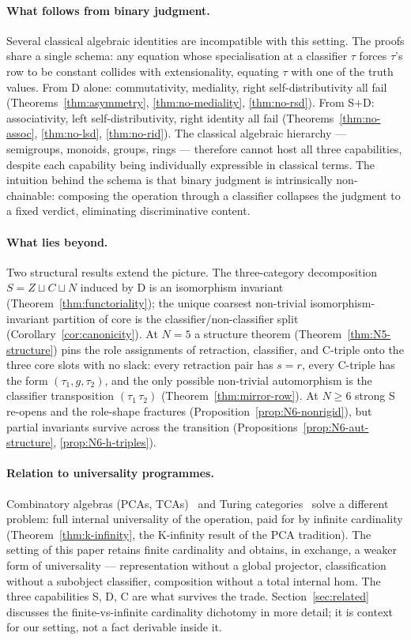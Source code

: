 \documentclass[sigconf,screen]{acmart}
\theoremstyle{remark}
\begin{document}
\paragraph{What follows from binary judgment.} Several classical
algebraic identities are incompatible with this setting. The proofs
share a single schema: any equation whose specialisation at a
classifier $\tau$ forces $\tau$'s row to be constant collides with
extensionality, equating $\tau$ with one of the truth values. From D
alone: commutativity, mediality, right self-distributivity all fail
(Theorems~\ref{thm:asymmetry}, \ref{thm:no-mediality}, \ref{thm:no-rsd}).
From S+D: associativity, left self-distributivity, right identity all
fail (Theorems~\ref{thm:no-assoc}, \ref{thm:no-lsd}, \ref{thm:no-rid}).
The classical algebraic hierarchy --- semigroups, monoids, groups, rings
--- therefore cannot host all three capabilities, despite each capability
being individually expressible in classical terms. The intuition behind
the schema is that binary judgment is intrinsically non-chainable:
composing the operation through a classifier collapses the judgment to
a fixed verdict, eliminating discriminative content.

\paragraph{What lies beyond.} Two structural results extend the picture.
The three-category decomposition $S = Z \sqcup C \sqcup N$ induced by D
is an isomorphism invariant (Theorem~\ref{thm:functoriality}); the
unique coarsest non-trivial isomorphism-invariant partition of core is
the classifier/non-classifier split (Corollary~\ref{cor:canonicity}).
At $N = 5$ a structure theorem (Theorem~\ref{thm:N5-structure}) pins the
role assignments of retraction, classifier, and C-triple onto the
three core slots with no slack: every retraction pair has $s = r$, every
C-triple has the form $(\tau_1, g, \tau_2)$, and the only possible
non-trivial automorphism is the classifier transposition
$(\tau_1\,\tau_2)$ (Theorem~\ref{thm:mirror-row}). At $N \geq 6$ strong S
re-opens and the role-shape fractures (Proposition~\ref{prop:N6-nonrigid}),
but partial invariants survive across the transition
(Propositions~\ref{prop:N6-aut-structure}, \ref{prop:N6-h-triples}).

\paragraph{Relation to universality programmes.} Combinatory algebras
(PCAs, TCAs)~\cite{vanoosten08, longley15, bethke88} and Turing
categories~\cite{cockett08} solve a different problem: full internal
universality of the operation, paid for by infinite cardinality
(Theorem~\ref{thm:k-infinity}, the K-infinity result of the PCA tradition).
The setting of this paper retains finite cardinality and obtains, in
exchange, a weaker form of universality --- representation without a
global projector, classification without a subobject classifier,
composition without a total internal hom. The three capabilities S, D, C
are what survives the trade. Section~\ref{sec:related} discusses the
finite-vs-infinite cardinality dichotomy in more detail; it is context
for our setting, not a fact derivable inside it.
\end{document}
